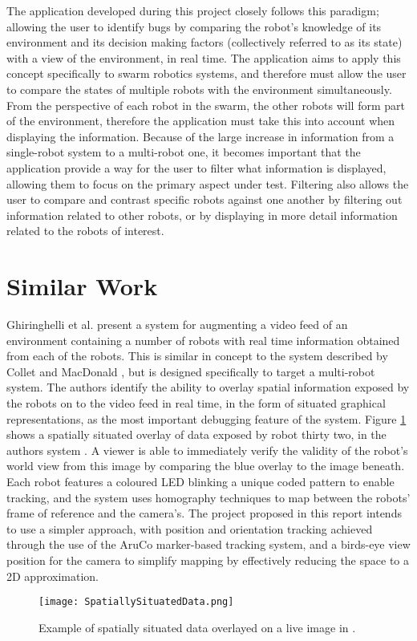 The application developed during this project closely follows this paradigm; allowing the user to identify bugs by comparing the robot's knowledge of its environment and its decision making factors (collectively referred to as its state) with a view of the environment, in real time. The application aims to apply this concept specifically to swarm robotics systems, and therefore must allow the user to compare the states of multiple robots with the environment simultaneously. From the perspective of each robot in the swarm, the other robots will form part of the environment, therefore the application must take this into account when displaying the information. Because of the large increase in information from a single-robot system to a multi-robot one, it becomes important that the application provide a way for the user to filter what information is displayed, allowing them to focus on the primary aspect under test. Filtering also allows the user to compare and contrast specific robots against one another by filtering out information related to other robots, or by displaying in more detail information related to the robots of interest.

\section{Similar Work} \label{SimilarWork}
Ghiringhelli et al. \cite{Ghiringhelli:2014} present a system for augmenting a video feed of an environment containing a number of robots with real time information obtained from each of the robots. This is similar in concept to the system described by Collet and MacDonald \cite{Collet:2006}, but is designed specifically to target a multi-robot system. The authors identify the ability to overlay spatial information exposed by the robots on to the video feed in real time, in the form of situated graphical representations, as the most important debugging feature of the system. Figure \ref{fig:SpatiallySituated} shows a spatially situated overlay of data exposed by robot thirty two, in the authors system \cite{Ghiringhelli:2014}. A viewer is able to immediately verify the validity of the robot's world view from this image by comparing the blue overlay to the image beneath. Each robot features a coloured LED blinking a unique coded pattern to enable tracking, and the system uses homography techniques to map between the robots' frame of reference and the camera's. The project proposed in this report intends to use a simpler approach, with position and orientation tracking achieved through the use of the AruCo \cite{Garrido:2014} marker-based tracking system, and a birds-eye view position for the camera to simplify mapping by effectively reducing the space to a 2D approximation.

\begin{figure}
	\begin{center}
	\texttt{[image: SpatiallySituatedData.png]}
	\decoRule
	\caption{Example of spatially situated data overlayed on a live image in \cite{Garrido:2014}.}
	\label{fig:SpatiallySituated}
	\end{center}
\end{figure}
